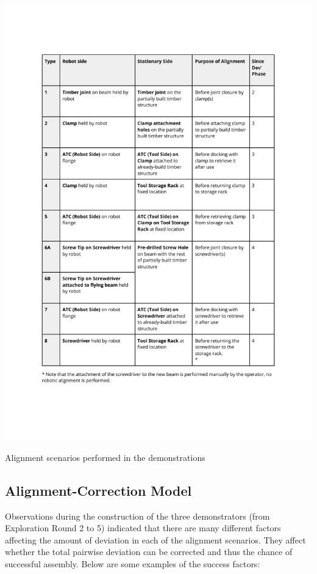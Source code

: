 \FloatBarrier
\begin{table}[ht]
    \includegraphics[page=1, trim=25.4mm 35mm 25.4mm 33mm, clip, width=\textwidth]{tables/Tables in Chapter 9 to 11.pdf}
    \caption{Alignment scenarios performed in the demonstrations}
    \label{table:alignment-scenarios}
\end{table}
\FloatBarrier

\subsection{Alignment-Correction Model}
\label{subsection:new-hypo-alignment-correction-model}

Observations during the construction of the three demonstrators (from Exploration Round 2 to 5) indicated that there are many different factors affecting the amount of deviation in each of the alignment scenarios. They affect whether the total pairwise deviation can be corrected and thus the chance of successful assembly. Below are some examples of the success factors:

